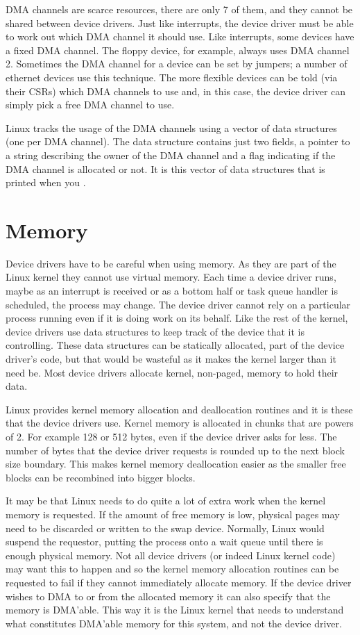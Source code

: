 DMA channels are scarce resources, there are only 7 of them, and they cannot be shared between device drivers.
Just like interrupts, the device driver must be able to work out which DMA channel it should use.
Like interrupts, some devices have a fixed DMA channel.
The floppy device, for example, always uses DMA channel 2.
Sometimes the DMA channel for a device can be set by jumpers; a number of ethernet devices use this technique.
The more flexible devices can be told (via their CSRs) which DMA channels to use and, in this case, the device
driver can simply pick a free DMA channel to use.

Linux tracks the usage of the DMA channels using a vector of  data structures (one per
DMA channel).
The  data structure contains just two fields, a pointer to a string describing the owner of
the DMA channel and a flag indicating if the DMA channel is allocated or not.
It is this vector of  data structures that is printed when you  .

\section{Memory}
Device drivers have to be careful when using memory.
As they are part of the Linux kernel they cannot use virtual memory.
Each time a device driver runs, maybe as an interrupt is received or as a bottom half 
or task queue handler is scheduled,
the   process may change.
The device driver cannot rely on a particular process running even if it is doing work on its behalf.
Like the rest of the kernel, device drivers use data structures to keep track of the device that it is controlling.
These data structures can be statically allocated, part of the device driver's code, but that would be wasteful as
it makes the kernel larger than it need be.
Most device drivers allocate kernel, non-paged, memory to hold their data.

Linux provides kernel memory allocation and deallocation routines and it is these that the device drivers use.
Kernel memory is allocated in chunks that are powers of 2.  
For example 128 or 512 bytes, even if the device driver asks for less.
The number of bytes that the device driver requests is rounded up to the next block size boundary.
This makes kernel memory deallocation easier as the smaller free blocks can be recombined into bigger blocks.

It may be that Linux needs to do quite a lot of extra work when the kernel memory is requested.
If the amount of free memory is low, physical pages may need to be discarded or written to the swap
device.
Normally, Linux would suspend the requestor, putting the process onto a wait queue until there
is enough physical memory.
Not all device drivers (or indeed Linux kernel code) may want this to happen and so the kernel memory
allocation routines can be requested to fail if they cannot immediately allocate memory.
If the device driver wishes to DMA to or from the allocated memory it can also specify that the memory
is DMA'able.
This way it is the Linux kernel that needs to understand what constitutes DMA'able memory for this system, and 
not the device driver.

